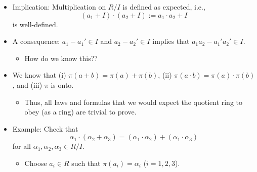 \documentclass[../notes.tex]{subfiles}
\begin{document}
\begin{itemize}
\begin{itemize}
\begin{align*}
            \pi^{-1}(\alpha_1)\cdot\pi^{-1}(\alpha_2) &= (a_1+I)\cdot(a_2+I)\\
            &= \{(a_1+c_1)(a_2+c_2):c_1,c_2\in I\}\\
            &= \{a_1\cdot a_2+a_1\cdot c_2+c_1\cdot(a_2+c_2):c_1,c_2\in I\}
            \intertext{Since $c_2,c_1$ are part of an ideal, $a_1c_2$ and $c_1(a_2+c_2)$ are elements of $I$. Since $I\leq(R,+)$, the sum of the terms is also an element of $I$. Thus, we can combine all of these terms into $I$, leaving only $a_1a_2$ behind. Therefore, the above is a\dots}
            &\subset a_1a_2+I
        \end{align*}
        \item Therefore,
        \begin{equation*}
            \pi(\pi^{-1}(\alpha_1)\cdot\pi^{-1}(\alpha_2)) = \{a_1a_2+I\}
        \end{equation*}
        which is a singleton.
    \end{itemize}
    \item Implication: Multiplication on $R/I$ is defined as expected, i.e.,
    \begin{equation*}
        (a_1+I)\cdot(a_2+I) := a_1\cdot a_2+I
    \end{equation*}
    is well-defined.
    \item A consequence: $a_1-a_1'\in I$ and $a_2-a_2'\in I$ implies that $a_1a_2-a_1'a_2'\in I$.
    \begin{itemize}
        \item How do we know this??
    \end{itemize}
    \item We know that (i) $\pi(a+b)=\pi(a)+\pi(b)$, (ii) $\pi(a\cdot b)=\pi(a)\cdot\pi(b)$, and (iii) $\pi$ is onto.
    \begin{itemize}
        \item Thus, all laws and formulas that we would expect the quotient ring to obey (as a ring) are trivial to prove.
    \end{itemize}
    \item Example: Check that
    \begin{equation*}
        \alpha_1\cdot(\alpha_2+\alpha_3) = (\alpha_1\cdot\alpha_2)+(\alpha_1\cdot\alpha_3)
    \end{equation*}
    for all $\alpha_1,\alpha_2,\alpha_3\in R/I$.
    \begin{itemize}
        \item Choose $a_i\in R$ such that $\pi(a_i)=\alpha_i$ ($i=1,2,3$).

\end{itemize}
\end{itemize}
\end{document}
